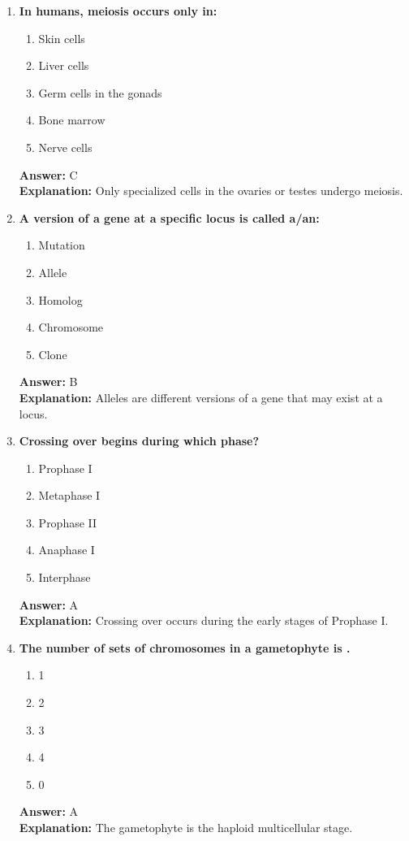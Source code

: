 \documentclass[11pt, a4paper]{article}
\begin{document}
\begin{enumerate}[leftmargin=*, label=\arabic*.]
\item \textbf{In humans, meiosis occurs only in:}
\begin{enumerate}[label=\Alph*.]
\item Skin cells
\item Liver cells
\item Germ cells in the gonads
\item Bone marrow
\item Nerve cells
\end{enumerate}
\textbf{Answer:} C \\
\textbf{Explanation:} Only specialized cells in the ovaries or testes undergo meiosis.

\item \textbf{A version of a gene at a specific locus is called a/an:}
\begin{enumerate}[label=\Alph*.]
\item Mutation
\item Allele
\item Homolog
\item Chromosome
\item Clone
\end{enumerate}
\textbf{Answer:} B \\
\textbf{Explanation:} Alleles are different versions of a gene that may exist at a locus.

\item \textbf{Crossing over begins during which phase?}
\begin{enumerate}[label=\Alph*.]
\item Prophase I
\item Metaphase I
\item Prophase II
\item Anaphase I
\item Interphase
\end{enumerate}
\textbf{Answer:} A \\
\textbf{Explanation:} Crossing over occurs during the early stages of Prophase I.

\item \textbf{The number of sets of chromosomes in a gametophyte is \underline{\hspace{1cm}}.}
\begin{enumerate}[label=\Alph*.]
\item 1
\item 2
\item 3
\item 4
\item 0
\end{enumerate}
\textbf{Answer:} A \\
\textbf{Explanation:} The gametophyte is the haploid multicellular stage.


\end{enumerate}
\end{document}
